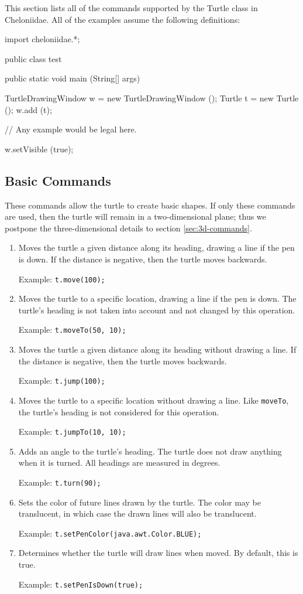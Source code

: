 \documentclass{article}
\newenvironment{commandtable}
  {\begin{enumerate}}
  {\end{enumerate}}
\def\command[#1]{\item[\tt #1]}
\def\example[#1]{\par Example: {\tt #1}}
\begin{document}
    This section lists all of the commands supported by the Turtle class in
    Cheloniidae. All of the examples assume the following definitions:

    \lstset{gobble=6}
    \begin{java}
      import cheloniidae.*;

      public class test {
	public static void main (String[] args) {
	  TurtleDrawingWindow w = new TurtleDrawingWindow ();
	  Turtle t = new Turtle ();
	  w.add (t);
	  
	  // Any example would be legal here.

	  w.setVisible (true);
	}
      }
    \end{java}

    \subsection{Basic Commands}
      \label{sec:basic-commands}

      These commands allow the turtle to create basic shapes. If only these
      commands are used, then the turtle will remain in a two-dimensional plane;
      thus we postpone the three-dimensional details to section
      \ref{sec:3d-commands}.

      \begin{commandtable}
	\command[move]
	Moves the turtle a given distance along its heading, drawing a line if
	the pen is down. If the distance is negative, then the turtle moves
	backwards.
	\example[t.move(100);]

	\command[moveTo]
	Moves the turtle to a specific location, drawing a line if the pen is
	down. The turtle's heading is not taken into account and not changed by
	this operation.
	\example[t.moveTo(50, 10);]

	\command[jump]
	Moves the turtle a given distance along its heading without drawing a
	line. If the distance is negative, then the turtle moves backwards.
	\example[t.jump(100);]

	\command[jumpTo]
	Moves the turtle to a specific location without drawing a line. Like
	{\tt moveTo}, the turtle's heading is not considered for this operation.
	\example[t.jumpTo(10, 10);]

	\command[turn]
	Adds an angle to the turtle's heading. The turtle does not draw anything
	when it is turned. All headings are measured in degrees.
	\example[t.turn(90);]

	\command[setPenColor]
	Sets the color of future lines drawn by the turtle. The color may be
	translucent, in which case the drawn lines will also be translucent.
	\example[t.setPenColor(java.awt.Color.BLUE);]

	\command[setPenIsDown]
	Determines whether the turtle will draw lines when moved. By default,
	this is true.
	\example[t.setPenIsDown(true);]
      \end{commandtable}
\end{document}
